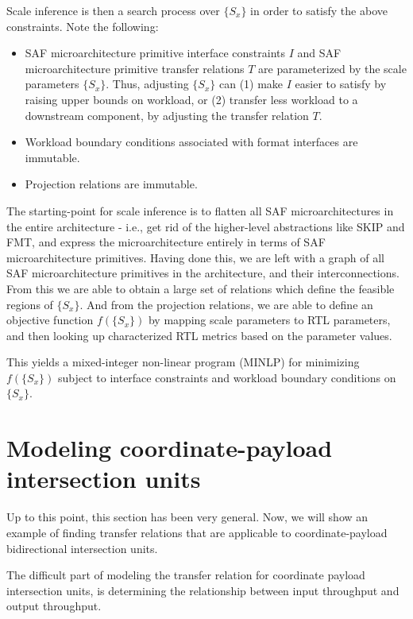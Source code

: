 Scale inference is then a search process over $\{S_x\}$ in order to satisfy the above constraints. Note the following:

\begin{itemize}
    \item SAF microarchitecture primitive interface constraints $I$ and SAF microarchitecture primitive transfer relations $T$ are parameterized by the scale parameters $\{S_x\}$. Thus, adjusting $\{S_x\}$ can (1) make $I$ easier to satisfy by raising upper bounds on workload, or (2) transfer less workload to a downstream component, by adjusting the transfer relation $T$.
    \item Workload boundary conditions associated with format interfaces are immutable.
    \item Projection relations are immutable.
\end{itemize}

The starting-point for scale inference is to flatten all SAF microarchitectures in the entire architecture - i.e., get rid of the higher-level abstractions like SKIP and FMT, and express the microarchitecture entirely in terms of SAF microarchitecture primitives. Having done this, we are left with a graph of all SAF microarchitecture primitives in the architecture, and their interconnections. From this we are able to obtain a large set of relations which define the feasible regions of $\{S_x\}$. And from the projection relations, we are able to define an objective function $f(\{S_x\})$ by mapping scale parameters to RTL parameters, and then looking up characterized RTL metrics based on the parameter values.

This yields a mixed-integer non-linear program (MINLP) for minimizing $f(\{S_x\})$ subject to interface constraints and workload boundary conditions on $\{S_x\}$.

\section{Modeling coordinate-payload intersection units}
\label{sec:c_c_isect_modeling}

Up to this point, this section has been very general. Now, we will show an example of finding transfer relations that are applicable to coordinate-payload bidirectional intersection units.

The difficult part of modeling the transfer relation for coordinate payload intersection units, is determining the relationship between input throughput and output throughput.

